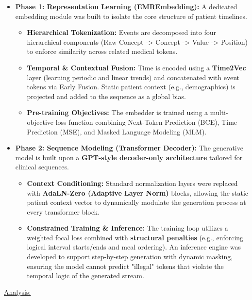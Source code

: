 \documentclass[
]{article}
\begin{document}
\begin{itemize}
\item
  \textbf{Phase 1: Representation Learning (EMREmbedding):} A dedicated
  embedding module was built to isolate the core structure of patient
  timelines.

  \begin{itemize}
  \item
    \textbf{Hierarchical Tokenization:} Events are decomposed into four
    hierarchical components (Raw Concept -\textgreater{} Concept
    -\textgreater{} Value -\textgreater{} Position) to enforce
    similarity across related medical tokens.
  \item
    \textbf{Temporal \& Contextual Fusion:} Time is encoded using a
    \textbf{Time2Vec} layer (learning periodic and linear trends) and
    concatenated with event tokens via Early Fusion. Static patient
    context (e.g., demographics) is projected and added to the sequence
    as a global bias.
  \item
    \textbf{Pre-training Objectives:} The embedder is trained using a
    multi-objective loss function combining Next-Token Prediction (BCE),
    Time Prediction (MSE), and Masked Language Modeling (MLM).
  \end{itemize}
\item
  \textbf{Phase 2: Sequence Modeling (Transformer Decoder):} The
  generative model is built upon a \textbf{GPT-style decoder-only
  architecture} tailored for clinical sequences.

  \begin{itemize}
  \item
    \textbf{Context Conditioning:} Standard normalization layers were
    replaced with \textbf{AdaLN-Zero (Adaptive Layer Norm)} blocks,
    allowing the static patient context vector to dynamically modulate
    the generation process at every transformer block.
  \item
    \textbf{Constrained Training \& Inference:} The training loop
    utilizes a weighted focal loss combined with \textbf{structural
    penalties} (e.g., enforcing logical interval starts/ends and meal
    ordering). An inference engine was developed to support step-by-step
    generation with dynamic masking, ensuring the model cannot predict
    "illegal" tokens that violate the temporal logic of the generated
    stream.
  \end{itemize}
\end{itemize}

\ul{Analysis:}
\end{document}
